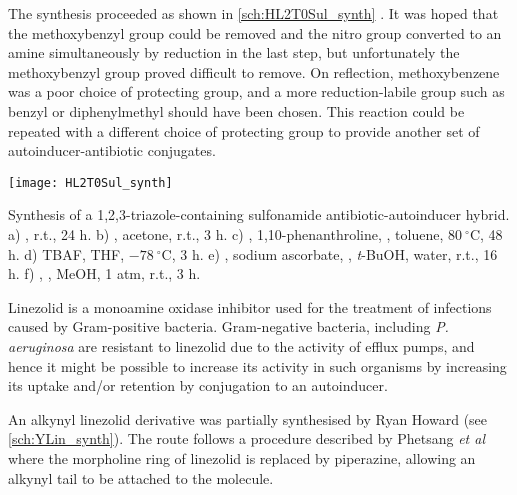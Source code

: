 The synthesis proceeded as shown in \ref{sch:HL2T0Sul_synth} \cite{Bendikov2005,Graux2014,IJsselstijn2006}. It was hoped that the methoxybenzyl group could be removed and the nitro group converted to an amine simultaneously by reduction in the last step, but unfortunately the methoxybenzyl group proved difficult to remove. On reflection, methoxybenzene was a poor choice of protecting group, and a more reduction-labile group such as benzyl or diphenylmethyl should have been chosen\cite{Wuts2007}.
This reaction could be repeated with a different choice of protecting group to provide another set of autoinducer-antibiotic conjugates.

\begin{scheme}[H]
	\begin{center}
		\texttt{[image: HL2T0Sul\_synth]}
		\caption{Synthesis of a 1,2,3-triazole-containing sulfonamide antibiotic-autoinducer hybrid.
		a) , r.t., 24 h. 
		b) , acetone, r.t., 3 h. 
		c) , 1,10-phenanthroline, , toluene, $80\ ^{\circ}$C, 48 h. 
		d) TBAF, THF, $-78\ ^{\circ}$C, 3 h. 
		e) , sodium ascorbate, , \textit{t}-BuOH, water, r.t., 16 h. 
		f) , , MeOH, 1 atm, r.t., 3 h.
		\label{sch:HL2T0Sul_synth}}
	\end{center}
\end{scheme}



Linezolid is a monoamine oxidase inhibitor used for the treatment of infections caused by Gram-positive bacteria.
Gram-negative bacteria, including \textit{P. aeruginosa} are resistant to linezolid due to the activity of efflux pumps, and hence it might be possible to increase its activity in such organisms by increasing its uptake and/or retention by conjugation to an autoinducer.

An alkynyl linezolid derivative  was partially synthesised by Ryan Howard (see \ref{sch:YLin_synth}). The route follows a procedure described by Phetsang \textit{et al}\cite{Phetsang2014} where the morpholine ring of linezolid is replaced by piperazine, allowing an alkynyl tail to be attached to the molecule.

